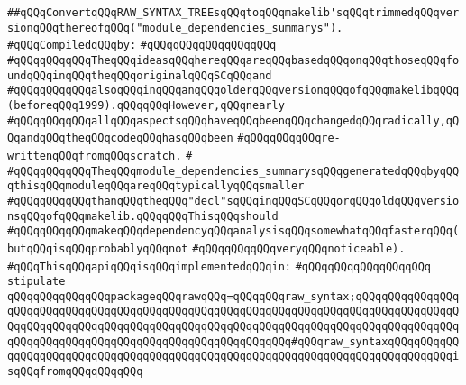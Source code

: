 \label{src/app/makelib/compilable/raw-syntax-to-module-dependencies-summary.api}
\verb|##qQQqConvertqQQqRAW_SYNTAX_TREEsqQQqtoqQQqmakelib'sqQQqtrimmedqQQqversionqQQqthereofqQQq("module_dependencies_summarys").|\newline
\newline
\verb|#qQQqCompiledqQQqby:|\newline
\verb|#qQQqqQQqqQQqqQQqqQQq|\newline
\newline
\verb|#qQQqqQQqqQQqTheqQQqideasqQQqhereqQQqareqQQqbasedqQQqonqQQqthoseqQQqfoundqQQqinqQQqtheqQQqoriginalqQQqSCqQQqand|\newline
\verb|#qQQqqQQqqQQqalsoqQQqinqQQqanqQQqolderqQQqversionqQQqofqQQqmakelibqQQq(beforeqQQq1999).qQQqqQQqHowever,qQQqnearly|\newline
\verb|#qQQqqQQqqQQqallqQQqaspectsqQQqhaveqQQqbeenqQQqchangedqQQqradically,qQQqandqQQqtheqQQqcodeqQQqhasqQQqbeen|\newline
\verb|#qQQqqQQqqQQqre-writtenqQQqfromqQQqscratch.|\newline
\verb|#|\newline
\verb|#qQQqqQQqqQQqTheqQQqmodule_dependencies_summarysqQQqgeneratedqQQqbyqQQqthisqQQqmoduleqQQqareqQQqtypicallyqQQqsmaller|\newline
\verb|#qQQqqQQqqQQqthanqQQqtheqQQq"decl"sqQQqinqQQqSCqQQqorqQQqoldqQQqversionsqQQqofqQQqmakelib.qQQqqQQqThisqQQqshould|\newline
\verb|#qQQqqQQqqQQqmakeqQQqdependencyqQQqanalysisqQQqsomewhatqQQqfasterqQQq(butqQQqisqQQqprobablyqQQqnot|\newline
\verb|#qQQqqQQqqQQqveryqQQqnoticeable).|\newline
\newline
\verb|#qQQqThisqQQqapiqQQqisqQQqimplementedqQQqin:|\newline
\verb|#qQQqqQQqqQQqqQQqqQQq|\newline
\newline
\verb|stipulate|\newline
\verb|qQQqqQQqqQQqqQQqpackageqQQqrawqQQq=qQQqqQQqraw_syntax;qQQqqQQqqQQqqQQqqQQqqQQqqQQqqQQqqQQqqQQqqQQqqQQqqQQqqQQqqQQqqQQqqQQqqQQqqQQqqQQqqQQqqQQqqQQqqQQqqQQqqQQqqQQqqQQqqQQqqQQqqQQqqQQqqQQqqQQqqQQqqQQqqQQqqQQqqQQqqQQqqQQqqQQqqQQqqQQqqQQqqQQqqQQqqQQqqQQqqQQq#qQQqraw_syntaxqQQqqQQqqQQqqQQqqQQqqQQqqQQqqQQqqQQqqQQqqQQqqQQqqQQqqQQqqQQqqQQqqQQqqQQqqQQqqQQqisqQQqfromqQQqqQQqqQQq|\newline

